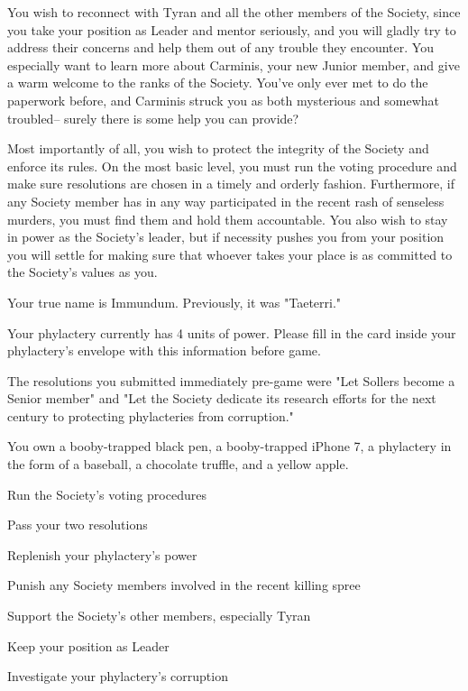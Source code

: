 \documentclass[char]{Sel}
\begin{document}
You wish to reconnect with Tyran and all the other members of the Society, since you take your position as Leader and mentor seriously, and you will gladly try to address their concerns and help them out of any trouble they encounter. You especially want to learn more about Carminis, your new Junior member, and give a warm welcome to the ranks of the Society. You've only ever met to do the paperwork before, and Carminis struck you as both mysterious and somewhat troubled-- surely there is some help you can provide?

Most importantly of all, you wish to protect the integrity of the Society and enforce its rules. On the most basic level, you must run the voting procedure and make sure resolutions are chosen in a timely and orderly fashion. Furthermore, if any Society member has in any way participated in the recent rash of senseless murders, you must find them and hold them accountable. You also wish to stay in power as the Society's leader, but if necessity pushes you from your position you will settle for making sure that whoever takes your place is as committed to the Society's values as you.
\begin{itemz}[Notes]
  \item Your true name is Immundum. Previously, it was "Taeterri."
    \item Your phylactery currently has 4 units of power. Please fill in the card inside your phylactery's envelope with this information before game.
  \item The resolutions you submitted immediately pre-game were "Let Sollers become a Senior member" and "Let the Society dedicate its research efforts for the next century to protecting phylacteries from corruption."
  \item You own a booby-trapped black pen, a booby-trapped iPhone 7, a phylactery in the form of a baseball, a chocolate truffle, and a yellow apple.
    \end{itemz}
    

     \begin{itemz}[Goals]
     \item Run the Society's voting procedures
 \item Pass your two resolutions
 \item Replenish your phylactery's power
\item Punish any Society members involved in the recent killing spree
\item Support the Society's other members, especially Tyran
\item Keep your position as Leader
\item Investigate your phylactery's corruption
\end{itemz}
\end{document}
